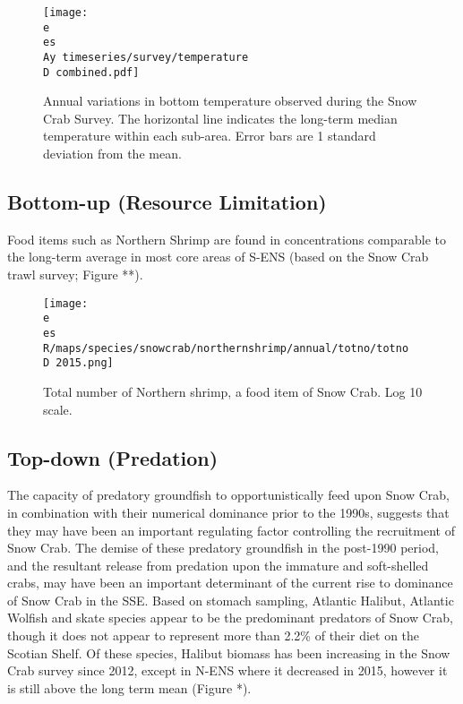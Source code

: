 \documentclass[paper=a4, fontsize=11pt]{article}
\newcommand{\D}{.}
\newcommand{\e}{/home/michelle/ecomod_data/}
\newcommand{\es}{snowcrab/}
\newcommand{\Ay}{assessments/2015/}
\begin{document}
\begin{figure}[h]
    \centering
    \texttt{[image: \\e \\es \\Ay timeseries/survey/temperature\\D combined.pdf]}
    \caption{Annual variations in bottom temperature observed during the Snow Crab Survey. The horizontal line indicates the long-term median temperature within each sub-area. Error bars are 1 standard deviation from the mean.}
\end{figure}


\subsection{Bottom-up (Resource Limitation)}

Food items such as Northern Shrimp are found in concentrations comparable to the long-term average in most core areas of S-ENS (based on the Snow Crab trawl survey; Figure **).

\begin{figure}[h]
  \centering
     \texttt{[image: \\e \\es R/maps/species/snowcrab/northernshrimp/annual/totno/totno\\D 2015.png]}
    \caption{Total number of Northern shrimp, a food item of Snow Crab. Log 10 scale.}
\end{figure}

\subsection{Top-down (Predation)}
The capacity of predatory groundfish to opportunistically feed upon Snow Crab, in combination with their numerical dominance prior to the 1990s, suggests that they may have been an important regulating factor controlling the recruitment of Snow Crab. The demise of these predatory groundfish in the post-1990 period, and the resultant release from predation upon the immature and soft-shelled crabs, may have been an important determinant of the current rise to dominance of Snow Crab in the SSE. Based on stomach sampling, Atlantic Halibut, Atlantic Wolfish and skate species appear to be the predominant predators of Snow Crab, though it does not appear to represent more than 2.2\% of their diet on the Scotian Shelf. Of these species, Halibut biomass has been increasing in the Snow Crab survey since 2012, except in N-ENS where it decreased in 2015, however it is still above the long term mean (Figure *). 
\end{document}
